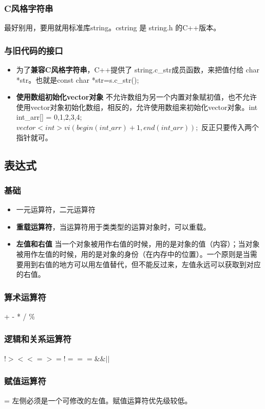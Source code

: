 \subsubsection{C风格字符串}
最好别用，要用就用标准库string。cstring 是 string.h 的C++版本。

\subsubsection{与旧代码的接口}
\begin{itemize}
	\item 为了\textbf{兼容C风格字符串}，C++提供了 string.c\_str成员函数，来把值付给 char *str。也就是const char *str=s.c\_str();
	\item \textbf{使用数组初始化vector对象} 不允许数组为另一个内置对象赋初值，也不允许使用vector对象初始化数组，相反的，允许使用数组来初始化vector对象。int int\_arr[] = {0,1,2,3,4};$vector<int> vi(begin(int\_arr)+1,end(int\_arr));$ 反正只要传入两个指针就可。
\end{itemize}

\subsection{表达式}
\subsubsection{基础}
\begin{itemize}
	\item 一元运算符，二元运算符
	\item \textbf{重载运算符}，当运算符用于类类型的运算对象时，可以重载。
	\item \textbf{左值和右值} 当一个对象被用作右值的时候，用的是对象的值（内容）；当对象被用作左值的时候，用的是对象的身份（在内存中的位置）。一个原则是当需要用到右值的地方可以用左值替代，但不能反过来，左值永远可以获取到对应的右值。
\end{itemize}

\subsubsection{算术运算符}
+ - * / \%  

\subsubsection{逻辑和关系运算符}
$! > < <= >= != == \&\& || $

\subsubsection{赋值运算符}
= 左侧必须是一个可修改的左值。赋值运算符优先级较低。

